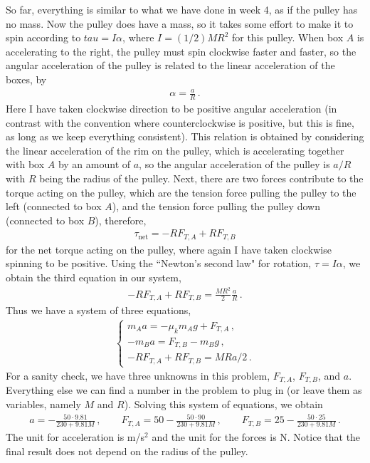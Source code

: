 \documentclass[11pt]{article}
\begin{document}
So far, everything is similar to what we have done in week 4, as if the pulley has no mass. Now the pulley does have a mass, so it takes some effort to make it to spin according to $tau = I \alpha$, where $I = (1/2) MR^2$ for this pulley. When box $A$ is accelerating to the right, the pulley must spin clockwise faster and faster, so the angular acceleration of the pulley is related to the linear acceleration of the boxes, by 
\begin{align*}
\alpha = \frac{a}{R}\,.
\end{align*}
Here I have taken clockwise direction to be positive angular acceleration (in contrast with the convention where counterclockwise is positive, but this is fine, as long as we keep everything consistent). This relation is obtained by considering the linear acceleration of the rim on the pulley, which is accelerating together with box $A$ by an amount of $a$, so the angular acceleration of the pulley is $a/R$ with $R$ being the radius of the pulley. Next, there are two forces contribute to the torque acting on the pulley, which are the tension force pulling the pulley to the left (connected to box $A$), and the tension force pulling the pulley down (connected to box $B$), therefore, 
\begin{align*}
\tau_{\text{net}} = -RF_{T,A} +RF_{T,B} 
\end{align*}
for the net torque acting on the pulley, where again I have taken clockwise spinning to be positive. Using the ``Newton's second law" for rotation, $\tau = I\alpha$, we obtain the third equation in our system, 
\begin{align*}
-RF_{T,A} +RF_{T,B} = \frac{MR^2}{2} \frac{a}{R}\,.
\end{align*}
Thus we have a system of three equations, 
\begin{align*}
\begin{cases}
m_A a = -\mu_k m_A g +F_{T,A}\,,\\
 -m_B a = F_{T,B} - m_B g\,,\\
 -RF_{T,A} +RF_{T,B} = MR a/2\,.
\end{cases}
\end{align*}
For a sanity check, we have three unknowns in this problem, $F_{T,A}$, $F_{T,B}$, and $a$. Everything else we can find a number in the problem to plug in (or leave them as variables, namely $M$ and $R$). Solving this system of equations, we obtain 
\begin{align*}
a= -\frac{50\cdot 9.81}{230+9.81 M}\,,\qquad
F_{T,A} = 50 -\frac{50\cdot 90}{230+9.81 M}\,,\qquad
F_{T,B} = 25 -\frac{50\cdot 25}{230+9.81 M}\,.
\end{align*}
The unit for acceleration is m/s$^2$ and the unit for the forces is N. Notice that the final result does not depend on the radius of the pulley. \\
\end{document}
